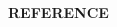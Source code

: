 \documentclass[12pt,a4paper,notitlepage,oneside]{report}
\title{\fontsize{16pt}{22pt}\selectfont\bf\ThesisTitle}
\author{}
\date{}
\begin{document}

\maketitle



\clearpage
\begin{spacing}{1.0}
\tableofcontents
\end{spacing}

\clearpage
{} %



{\def\chapter*#1{}
\clearpage
\begin{center}\fontsize{14pt}{14pt}\selectfont\bf REFERENCE\end{center}
\begin{spacing}{1.5}
\fontsize{12pt}{12pt}\selectfont

\end{spacing}}
\end{document}
